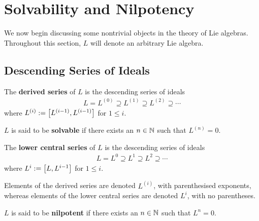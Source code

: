 \section{Solvability and Nilpotency}

We now begin discussing some nontrivial objects in the theory of Lie algebras. Throughout this section, $L$ will denote an arbitrary Lie algebra.

\subsection{Descending Series of Ideals}

\begin{boxdefinition}
    The \textbf{derived series} of $L$ is the descending series of ideals
    \begin{align*}
        L = L^{(0)} \supseteq L^{(1)} \supseteq L^{(2)} \supseteq \cdots %
    \end{align*}
    where $L^{(i)} := \left[ L^{(i - 1)}, L^{(i-1)} \right]$ for $1 \leq i$. %
\end{boxdefinition}

\begin{boxdefinition}[Solvability]
    $L$ is said to be \textbf{solvable} if there exists an $n \in \mathbb{N}$ such that $L^{(n)} = 0$.
\end{boxdefinition}

\begin{boxdefinition}
    The \textbf{lower central series} of $L$ is the descending series of ideals
    \begin{align*}
        L = L^{0} \supseteq L^{1} \supseteq L^{2} \supseteq \cdots %
    \end{align*}
    where $L^{i} := \left[ L, L^{i-1} \right]$ for $1 \leq i$. %
\end{boxdefinition}

\begin{boxconvention}
    Elements of the derived series are denoted $L^{(i)}$, with parenthesised exponents, whereas elements of the lower central series are denoted $L^{i}$, with no parentheses.
\end{boxconvention}

\begin{boxdefinition}[Nilpotency]
    $L$ is said to be \textbf{nilpotent} if there exists an $n \in \mathbb{N}$ such that $L^{n} = 0$.
\end{boxdefinition}

